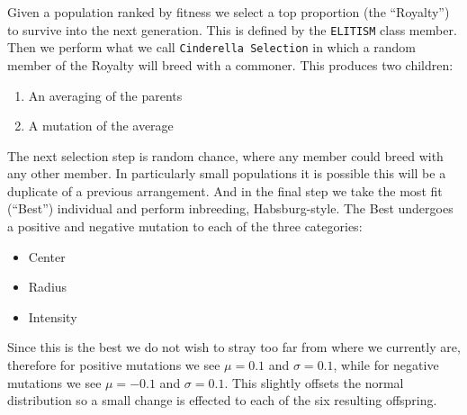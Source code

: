 \documentclass[12pt]{article}
\begin{document}
Given a population ranked by fitness we select a top proportion (the ``Royalty'') to survive into the next generation. This is defined by the \texttt{ELITISM} class member. Then we perform what we call \texttt{Cinderella Selection} in which a random member of the Royalty will breed with a commoner. This produces two children:
\begin{enumerate}
    \item An averaging of the parents
    \item A mutation of the average
\end{enumerate}

The next selection step is random chance, where any member could breed with any other member. In particularly small populations it is possible this will be a duplicate of a previous arrangement. And in the final step we take the most fit (``Best'') individual and perform inbreeding, Habsburg-style. The Best undergoes a positive and negative mutation to each of the three categories:
\begin{itemize}
    \item Center
    \item Radius
    \item Intensity
\end{itemize}

Since this is the best we do not wish to stray too far from where we currently are, therefore for positive mutations we see $\mu = 0.1$ and $\sigma = 0.1$, while for negative mutations we see $\mu = -0.1$ and $\sigma = 0.1$. This slightly offsets the normal distribution so a small change is effected to each of the six resulting offspring.


\end{document}
